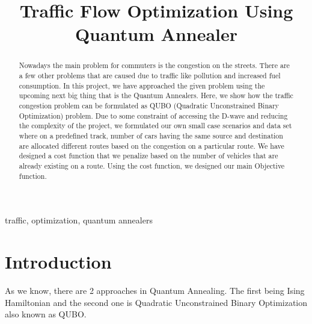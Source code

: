 \documentclass[conference]{IEEEtran}
\begin{document}
\title{Traffic Flow Optimization Using Quantum Annealer}

\author{
\and
{}
}

\maketitle

\begin{abstract}
Nowadays the main problem for commuters is the congestion on the streets. There are a few other problems that are caused due to traffic like pollution and increased fuel consumption. In this project, we have approached the given problem using the upcoming next big thing that is the Quantum Annealers. Here, we show how the traffic congestion problem can be formulated as QUBO (Quadratic Unconstrained Binary Optimization) problem. Due to some constraint of accessing the D-wave and reducing the complexity of the project, we formulated our own small case scenarios and data set where on a predefined track, number of cars having the same source and destination are allocated different routes based on the congestion on a particular route. We have designed a cost function that we penalize based on the number of vehicles that are already existing on a route. Using the cost function, we designed our main Objective function.

\end{abstract}
\vspace{6pt}
\begin{IEEEkeywords}
traffic, optimization, quantum annealers
\end{IEEEkeywords}

\section{Introduction}
As we know, there are 2 approaches in Quantum Annealing. The first being Ising Hamiltonian and the second one is Quadratic Unconstrained Binary Optimization also known as QUBO.\vspace{6pt}
\end{document}
